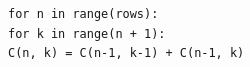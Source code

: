 \documentclass[preview]{standalone}
\begin{document}
\begin{center}
\texttt{for n in range(rows):} \\ \texttt{for k in range(n + 1):} \\ \texttt{C(n, k) = C(n-1, k-1) + C(n-1, k)}
\end{center}
\end{document}
